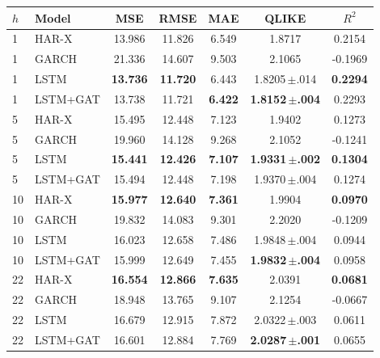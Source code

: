 \begin{tabular}{llccccc}
\toprule
$h$ & Model & MSE & RMSE & MAE & QLIKE & $R^2$ \\
\midrule
1 & HAR-X & 13.986 & 11.826 & 6.549 & 1.8717 & 0.2154 \\
1 & GARCH & 21.336 & 14.607 & 9.503 & 2.1065 & -0.1969 \\
1 & LSTM & \textbf{13.736} & \textbf{11.720} & 6.443 & 1.8205\,$\pm$.014 & \textbf{0.2294} \\
1 & LSTM+GAT & 13.738 & 11.721 & \textbf{6.422} & \textbf{1.8152\,$\pm$.004} & 0.2293 \\
\midrule
5 & HAR-X & 15.495 & 12.448 & 7.123 & 1.9402 & 0.1273 \\
5 & GARCH & 19.960 & 14.128 & 9.268 & 2.1052 & -0.1241 \\
5 & LSTM & \textbf{15.441} & \textbf{12.426} & \textbf{7.107} & \textbf{1.9331\,$\pm$.002} & \textbf{0.1304} \\
5 & LSTM+GAT & 15.494 & 12.448 & 7.198 & 1.9370\,$\pm$.004 & 0.1274 \\
\midrule
10 & HAR-X & \textbf{15.977} & \textbf{12.640} & \textbf{7.361} & 1.9904 & \textbf{0.0970} \\
10 & GARCH & 19.832 & 14.083 & 9.301 & 2.2020 & -0.1209 \\
10 & LSTM & 16.023 & 12.658 & 7.486 & 1.9848\,$\pm$.004 & 0.0944 \\
10 & LSTM+GAT & 15.999 & 12.649 & 7.455 & \textbf{1.9832\,$\pm$.004} & 0.0958 \\
\midrule
22 & HAR-X & \textbf{16.554} & \textbf{12.866} & \textbf{7.635} & 2.0391 & \textbf{0.0681} \\
22 & GARCH & 18.948 & 13.765 & 9.107 & 2.1254 & -0.0667 \\
22 & LSTM & 16.679 & 12.915 & 7.872 & 2.0322\,$\pm$.003 & 0.0611 \\
22 & LSTM+GAT & 16.601 & 12.884 & 7.769 & \textbf{2.0287\,$\pm$.001} & 0.0655 \\
\bottomrule
\end{tabular}
